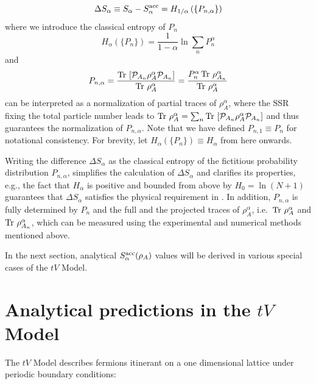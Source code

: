 %
\begin{equation}
    \Delta S_{\alpha}\equiv  S_{\alpha} - S_{\alpha}^{{\rm acc}} = H_{{1}/{\alpha}}\left(\{P_{n,\alpha}\}\right)
\label{eq:S_alpha_acc5}
\end{equation}
%
where we introduce the classical \ren entropy of $P_n$
%
\begin{equation}
    H_{\alpha}\left(\{P_n\}\right)=\frac{1}{1-\alpha}\ln\sum_n P_n^{\alpha} 
\label{eq:Halpha}
\end{equation}
%
and
%
\begin{equation}
    P_{n,\alpha}=\frac{\operatorname{Tr}\, \left[{\mathcal{P}}_{A_{n}} \rho_A^{\alpha} {\mathcal{P}}_{A_{n}}\right]}{\operatorname{Tr}\, \rho_A^{\alpha}}=\frac{ P_n^\alpha\operatorname{Tr}\, \rho_{A_n}^{\alpha}}{\operatorname{Tr}\, \rho_A^{\alpha}}
\label{eq:Pna}
\end{equation}
%
can be interpreted as a normalization of partial traces of $\rho_A^{\alpha}$, where the SSR fixing the total particle number leads to $\operatorname{Tr}\, \rho_A^{\alpha}=\sum_n \operatorname{Tr}\, \left[{\mathcal{P}}_{A_{n}} \rho_A^{\alpha} {\mathcal{P}}_{A_{n}}\right]$ and thus guarantees the normalization of $P_{n,\alpha}$. Note that we have defined $P_{n,1} \equiv P_n$ for notational consistency. For brevity, let $H_{\alpha}(\{P_n\}) \equiv H_{\alpha}$ from here onwards. 

Writing the difference $\Delta S_{\alpha}$ as the classical \ren entropy of the fictitious probability distribution $P_{n,\alpha}$, simplifies the calculation of $\Delta S_{\alpha}$ and clarifies its properties, e.g., the fact that $H_{\alpha}$  is positive and bounded from above by $ H_{0}=\ln(N+1)$ guarantees that $\Delta S_{\alpha}$ satisfies the physical requirement in . \cite{Barghathi:2018oe} In addition, $P_{n,\alpha}$ is fully determined by $P_n$ and the full and the projected traces of $\rho_A^{\alpha}$, i.e.~$\operatorname{Tr}\, \rho_{A}^{\alpha}$ and $\operatorname{Tr}\, \rho_{A_n}^{\alpha}$, which can be measured using the experimental and numerical methods mentioned above.    

In the next section, analytical $S_{\alpha}^{\rm acc}(\rho_A)$ values will be derived in various special cases of the $tV$ Model.

\section{Analytical predictions in the $tV$ Model}

The $tV$ Model describes fermions itinerant on a one dimensional lattice under periodic boundary conditions:

